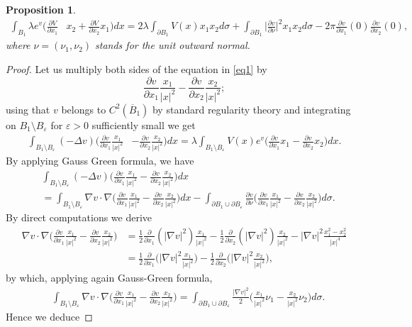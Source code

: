 \documentclass[reqno,11pt]{amsart}
\newtheorem{prop}[thm]{Proposition}
\theoremstyle{definition}
\numberwithin{equation}{section}
\newcommand{\la}{\lambda}
\newcommand{\e}{\varepsilon}
\renewcommand{\(}{\left(}
\renewcommand{\)}{\right)}
\renewcommand{\[}{\left[}
\renewcommand{\]}{\right]}
\newcommand{\beq}{\begin{equation}}
\newcommand{\eeq}{\end{equation}}
\begin{document}
{\begin{prop}
$$\begin{aligned}\int_{B_1} \la e^{v}\bigg(\frac{\partial V}{\partial x_1}&x_2+\frac{\partial V}{\partial x_2}x_1\bigg) dx =2\la\int_{\partial B_1}  V(x)x_1x_2d\sigma+\int_{\partial B_1}\bigg|\frac{\partial v}{\partial \nu}\bigg|^2 x_1x_2 d\sigma
-2\pi
\frac{\partial v}{\partial x_1}(0)\frac{\partial v}{\partial x_2}(0),
\end{aligned}$$
where $\nu=(\nu_1,\nu_2)$ stands for the unit outward normal. \end{prop}

\begin{proof} Let us multiply  both sides of the equation in \eqref{eq1} by $$\frac{\partial v}{\partial x_1}\frac{x_1}{|x|^{2}}-\frac{\partial v}{\partial x_2}\frac{x_2}{|x|^{2}};$$ using that $v$ belongs to $C^2(\overline{B}_1)$ by standard regularity theory   and integrating on $B_1\setminus B_\e$ for $\e>0$ sufficiently small we get 
\beq\label{leftright}\begin{aligned}\int_{B_1\setminus B_\e} (-\Delta v)\bigg(\frac{\partial v}{\partial x_1}\frac{x_1}{|x|^{2}}&-\frac{\partial v}{\partial x_2}\frac{x_2}{|x|^{2}}\bigg)dx=\la \int_{B_1\setminus B_\e}V(x) e^{v}\bigg(\frac{\partial v}{\partial x_1}x_1-\frac{\partial v}{\partial x_2}x_2\bigg)dx.\end{aligned}\eeq
By applying Gauss Green formula, we have
$$\begin{aligned}&\int_{B_1\setminus B_\e} (-\Delta v)\bigg(\frac{\partial v}{\partial x_1}\frac{x_1}{|x|^{2}}-\frac{\partial v}{\partial x_2}\frac{x_2}{|x|^{2}}\bigg)dx\\ &=
\int_{B_1\setminus B_\e} \nabla v\cdot \nabla\bigg(\frac{\partial v}{\partial x_1}\frac{x_1}{|x|^{2}}-\frac{\partial v}{\partial x_2}\frac{x_2}{|x|^{2}}\bigg)dx-\int_{\partial B_1\cup\partial B_\e }\frac{\partial v}{\partial \nu}\bigg(\frac{\partial v}{\partial x_1}\frac{x_1}{|x|^{2}}-\frac{\partial v}{\partial x_2}\frac{x_2}{|x|^{2}}\bigg)d\sigma .
\end{aligned} $$
By direct computations  we derive
$$\begin{aligned}\nabla v\cdot \nabla \bigg(\frac{\partial v}{\partial x_1}\frac{x_1}{|x|^2}-\frac{\partial v}{\partial x_2}\frac{x_2}{|x|^2}\bigg) &=
\frac12\frac{\partial }{\partial x_1}(|\nabla v|^2)\frac{x_1}{|x|^2}-\frac12\frac{\partial }{\partial x_2}(|\nabla v|^2)\frac{x_2}{|x|^2}-|\nabla v|^2 \frac{x_1^{2}-x_2^2}{|x|^{4}}
\\ &=\frac12\frac{\partial}{\partial x_1}\bigg(|\nabla v|^2 \frac{x_1}{|x|^2}\bigg)-\frac12 \frac{\partial}{\partial x_2}\bigg(|\nabla v|^2 \frac{x_2}{|x|^2}\bigg),
\end{aligned}$$
by which, applying again Gauss-Green formula,
$$\begin{aligned}&\int_{B_1\setminus B_\e} \nabla v\cdot \nabla \bigg(\frac{\partial v}{\partial x_1}\frac{x_1}{|x|^2}-\frac{\partial v}{\partial x_2}\frac{x_2}{|x|^2}\bigg)
 = \int_{\partial B_1\cup\partial B_\e} \frac{|\nabla v|^2}{2} \bigg(\frac{x_1}{|x|^2}\nu_1-\frac{x_2}{|x|^2}\nu_2\bigg) d\sigma
.
\end{aligned}$$
Hence we deduce


\end{proof}}
\end{document}
